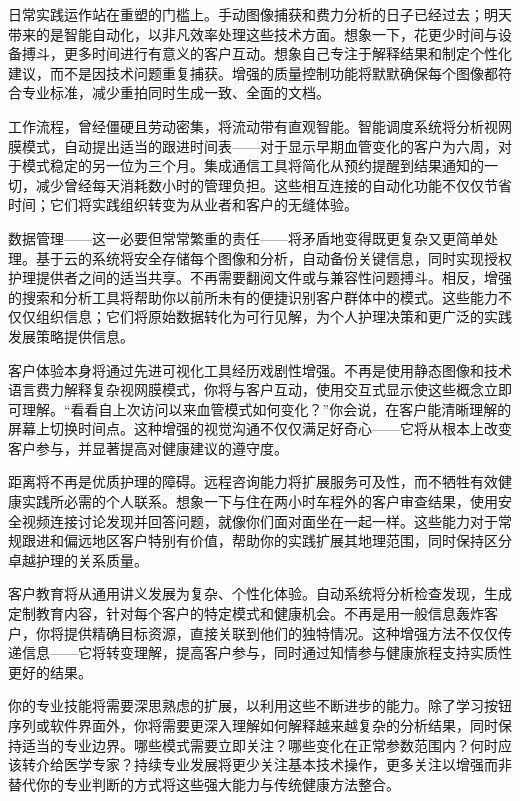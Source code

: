 \documentclass[
  Letterpaper,
]{scrbook}
\begin{document}
日常实践运作站在重塑的门槛上。手动图像捕获和费力分析的日子已经过去；明天带来的是智能自动化，以非凡效率处理这些技术方面。想象一下，花更少时间与设备搏斗，更多时间进行有意义的客户互动。想象自己专注于解释结果和制定个性化建议，而不是因技术问题重复捕获。增强的质量控制功能将默默确保每个图像都符合专业标准，减少重拍同时生成一致、全面的文档。

工作流程，曾经僵硬且劳动密集，将流动带有直观智能。智能调度系统将分析视网膜模式，自动提出适当的跟进时间表------对于显示早期血管变化的客户为六周，对于模式稳定的另一位为三个月。集成通信工具将简化从预约提醒到结果通知的一切，减少曾经每天消耗数小时的管理负担。这些相互连接的自动化功能不仅仅节省时间；它们将实践组织转变为从业者和客户的无缝体验。

数据管理------这一必要但常常繁重的责任------将矛盾地变得既更复杂又更简单处理。基于云的系统将安全存储每个图像和分析，自动备份关键信息，同时实现授权护理提供者之间的适当共享。不再需要翻阅文件或与兼容性问题搏斗。相反，增强的搜索和分析工具将帮助你以前所未有的便捷识别客户群体中的模式。这些能力不仅仅组织信息；它们将原始数据转化为可行见解，为个人护理决策和更广泛的实践发展策略提供信息。

客户体验本身将通过先进可视化工具经历戏剧性增强。不再是使用静态图像和技术语言费力解释复杂视网膜模式，你将与客户互动，使用交互式显示使这些概念立即可理解。``看看自上次访问以来血管模式如何变化？''你会说，在客户能清晰理解的屏幕上切换时间点。这种增强的视觉沟通不仅仅满足好奇心------它将从根本上改变客户参与，并显著提高对健康建议的遵守度。

距离将不再是优质护理的障碍。远程咨询能力将扩展服务可及性，而不牺牲有效健康实践所必需的个人联系。想象一下与住在两小时车程外的客户审查结果，使用安全视频连接讨论发现并回答问题，就像你们面对面坐在一起一样。这些能力对于常规跟进和偏远地区客户特别有价值，帮助你的实践扩展其地理范围，同时保持区分卓越护理的关系质量。

客户教育将从通用讲义发展为复杂、个性化体验。自动系统将分析检查发现，生成定制教育内容，针对每个客户的特定模式和健康机会。不再是用一般信息轰炸客户，你将提供精确目标资源，直接关联到他们的独特情况。这种增强方法不仅仅传递信息------它将转变理解，提高客户参与，同时通过知情参与健康旅程支持实质性更好的结果。

你的专业技能将需要深思熟虑的扩展，以利用这些不断进步的能力。除了学习按钮序列或软件界面外，你将需要更深入理解如何解释越来越复杂的分析结果，同时保持适当的专业边界。哪些模式需要立即关注？哪些变化在正常参数范围内？何时应该转介给医学专家？持续专业发展将更少关注基本技术操作，更多关注以增强而非替代你的专业判断的方式将这些强大能力与传统健康方法整合。
\end{document}
